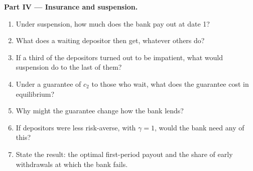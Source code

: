 \begin{problem}
\medskip
\noindent\textbf{Part IV --- Insurance and suspension.}
\begin{enumerate}[resume]
  \item Under suspension, how much does the bank pay out at date 1?
  \item What does a waiting depositor then get, whatever others do?
  \item If a third of the depositors turned out to be impatient, what would suspension do to the last of them?
  \item Under a guarantee of $c_2$ to those who wait, what does the guarantee cost in equilibrium?
  \item Why might the guarantee change how the bank lends?
  \item If depositors were less risk-averse, with $\gamma = 1$, would the bank need any of this?
  \item State the result: the optimal first-period payout and the share of early withdrawals at which the bank fails.
\end{enumerate}
\end{problem}
